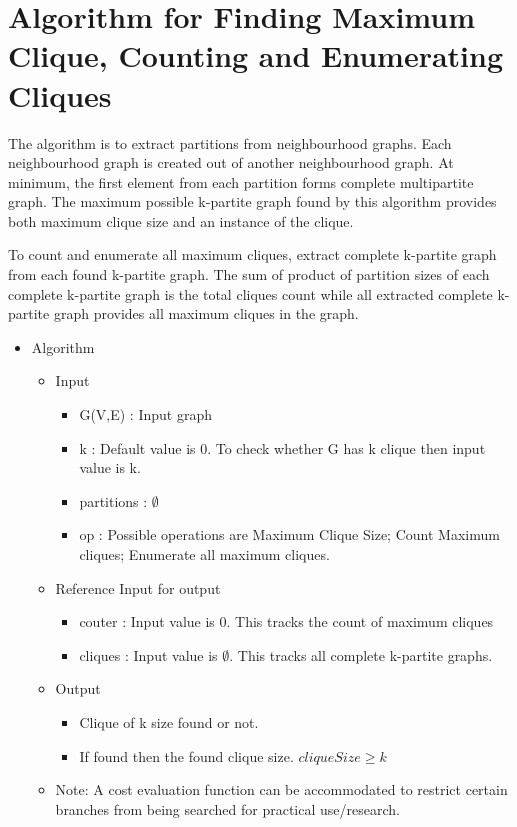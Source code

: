 \documentclass[12pt]{article}
\theoremstyle{plain}
\theoremstyle{definition}
\begin{document}
\section{Algorithm for Finding Maximum Clique, Counting and Enumerating Cliques}

The algorithm is to extract partitions from neighbourhood graphs. Each neighbourhood graph is created out of another neighbourhood graph. At minimum, the first element from each partition forms complete multipartite graph. The maximum possible k-partite graph found by this algorithm provides both maximum clique size and an instance of the clique.

To count and enumerate all maximum cliques, extract complete k-partite graph from each found k-partite graph. The sum of product of partition sizes of each complete k-partite graph is the total cliques count while all extracted complete k-partite graph provides all maximum cliques in the graph.


\begin{itemize}
	\setlength{\itemsep}{0pt}
	\setlength{\parskip}{0pt}
	\setlength{\parsep}{0pt}
	\item Algorithm
	\begin{itemize}
		\setlength{\itemsep}{0pt}
		\setlength{\parskip}{0pt}
		\setlength{\parsep}{0pt}
		\item Input
		\begin{itemize}
			\item G(V,E)	: Input graph
			\item k : Default value is 0. To check whether G has k clique then input value is k.
			\item partitions : $\emptyset$
			\item op : Possible operations are Maximum Clique Size; Count Maximum cliques; Enumerate all maximum cliques.
		\end{itemize}
		\item Reference Input for output
		\begin{itemize}
			\item couter : Input value is 0. This tracks the count of maximum cliques
			\item cliques : Input value is $\emptyset$. This tracks all complete k-partite graphs.
		\end{itemize}
		\item Output
		\begin{itemize}
			\item Clique of k size found or not.
			\item If found then the found clique size. $cliqueSize \ge k$
		\end{itemize}
		\item Note: A cost evaluation function can be accommodated to restrict certain branches from being searched for practical use/research. 
	\end{itemize}
\end{itemize}
	
\end{document}
